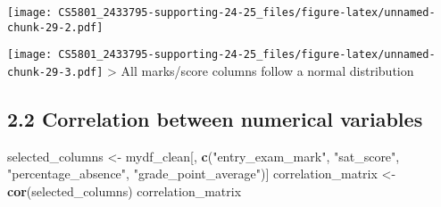\documentclass[
]{article}
\newenvironment{Shaded}{\begin{snugshade}}{\end{snugshade}}
\newcommand{\AttributeTok}[1]{\textcolor[rgb]{0.13,0.29,0.53}{#1}}
\newcommand{\CommentTok}[1]{\textcolor[rgb]{0.56,0.35,0.01}{\textit{#1}}}
\newcommand{\DecValTok}[1]{\textcolor[rgb]{0.00,0.00,0.81}{#1}}
\newcommand{\FunctionTok}[1]{\textcolor[rgb]{0.13,0.29,0.53}{\textbf{#1}}}
\newcommand{\NormalTok}[1]{#1}
\newcommand{\OtherTok}[1]{\textcolor[rgb]{0.56,0.35,0.01}{#1}}
\newcommand{\SpecialCharTok}[1]{\textcolor[rgb]{0.81,0.36,0.00}{\textbf{#1}}}
\newcommand{\StringTok}[1]{\textcolor[rgb]{0.31,0.60,0.02}{#1}}
\begin{document}
\begin{Shaded}
\end{Shaded}

\texttt{[image: CS5801\_2433795-supporting-24-25\_files/figure-latex/unnamed-chunk-29-2.pdf]}

\begin{Shaded}
\end{Shaded}

\texttt{[image: CS5801\_2433795-supporting-24-25\_files/figure-latex/unnamed-chunk-29-3.pdf]}
\textgreater{} All marks/score columns follow a normal distribution

\subsection{2.2 Correlation between numerical
variables}\label{correlation-between-numerical-variables}

\begin{Shaded}
\begin{Highlighting}[]
\NormalTok{selected\_columns }\OtherTok{\textless{}{-}}\NormalTok{ mydf\_clean[, }\FunctionTok{c}\NormalTok{(}\StringTok{"entry\_exam\_mark"}\NormalTok{, }\StringTok{"sat\_score"}\NormalTok{, }\StringTok{"percentage\_absence"}\NormalTok{, }\StringTok{"grade\_point\_average"}\NormalTok{)]}
\NormalTok{correlation\_matrix }\OtherTok{\textless{}{-}} \FunctionTok{cor}\NormalTok{(selected\_columns)}
\NormalTok{correlation\_matrix}
\end{Highlighting}
\end{Shaded}
\end{document}
